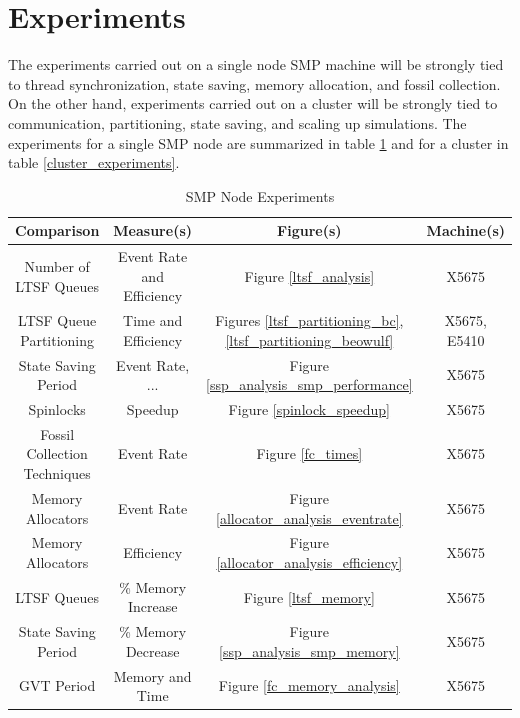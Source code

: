 \documentclass[11pt]{book}
\begin{document}
\section{Experiments}

The experiments carried out on a single node SMP machine will be strongly tied to thread
synchronization, state saving, memory allocation, and fossil collection.  On the other hand,
experiments carried out on a cluster will be strongly tied to communication, partitioning,
state saving, and scaling up simulations.  The experiments for a single SMP node are summarized
in table \ref{smp_experiments} and for a cluster in table \ref{cluster_experiments}.

\begin{table}[H]
    \centering
    \begin{tabular}{| c | c | c | c |}
        \hline
        \textbf{Comparison} & \textbf{Measure(s)}  & \textbf{Figure(s)}   & \textbf{Machine(s)}  \\
        \hline
        Number of LTSF Queues & Event Rate and Efficiency   & Figure \ref{ltsf_analysis}    & X5675             \\
        \hline
        LTSF Queue Partitioning & Time and Efficiency    & Figures \ref{ltsf_partitioning_bc},
            \ref{ltsf_partitioning_beowulf}    & X5675, E5410 \\
        \hline
        State Saving Period & Event Rate, ...  & Figure \ref{ssp_analysis_smp_performance} & X5675 \\
        \hline
        Spinlocks & Speedup  & Figure \ref{spinlock_speedup} & X5675 \\
        \hline
        Fossil Collection Techniques & Event Rate    & Figure \ref{fc_times} & X5675 \\
        \hline
        Memory Allocators & Event Rate   & Figure \ref{allocator_analysis_eventrate} & X5675 \\
        \hline
        Memory Allocators & Efficiency   & Figure \ref{allocator_analysis_efficiency}    & X5675 \\
        \hline
        LTSF Queues & \% Memory Increase & Figure \ref{ltsf_memory}  & X5675 \\
        \hline
        State Saving Period & \% Memory Decrease & Figure \ref{ssp_analysis_smp_memory}  & X5675 \\
        \hline
        GVT Period & Memory and Time & Figure \ref{fc_memory_analysis}   & X5675 \\
        \hline
    \end{tabular}
    \caption{SMP Node Experiments}\label{smp_experiments}
\end{table}
\end{document}
